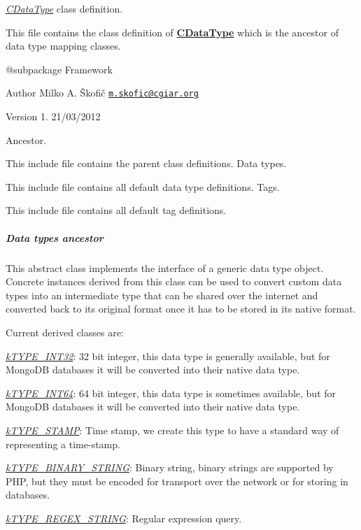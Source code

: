{\itshape \hyperlink{class_c_data_type}{C\-Data\-Type}} class definition.

This file contains the class definition of {\bfseries \hyperlink{class_c_data_type}{C\-Data\-Type}} which is the ancestor of data type mapping classes.

\begin{DoxyVerb} @subpackage        Framework
\end{DoxyVerb}


\begin{DoxyAuthor}{Author}
Milko A. Škofič \href{mailto:m.skofic@cgiar.org}{\tt m.\-skofic@cgiar.\-org} 
\end{DoxyAuthor}
\begin{DoxyVersion}{Version}
1. 21/03/2012
\end{DoxyVersion}
Ancestor.

This include file contains the parent class definitions. Data types.

This include file contains all default data type definitions. Tags.

This include file contains all default tag definitions. \subparagraph*{Data types ancestor}

This abstract class implements the interface of a generic data type object. Concrete instances derived from this class can be used to convert custom data types into an intermediate type that can be shared over the internet and converted back to its original format once it has to be stored in its native format.

Current derived classes are\-:


\begin{DoxyItemize}
\item {\itshape \hyperlink{}{k\-T\-Y\-P\-E\-\_\-\-I\-N\-T32}}\-: 32 bit integer, this data type is generally available, but for Mongo\-D\-B databases it will be converted into their native data type. 
\item {\itshape \hyperlink{}{k\-T\-Y\-P\-E\-\_\-\-I\-N\-T64}}\-: 64 bit integer, this data type is sometimes available, but for Mongo\-D\-B databases it will be converted into their native data type. 
\item {\itshape \hyperlink{}{k\-T\-Y\-P\-E\-\_\-\-S\-T\-A\-M\-P}}\-: Time stamp, we create this type to have a standard way of representing a time-\/stamp. 
\item {\itshape \hyperlink{}{k\-T\-Y\-P\-E\-\_\-\-B\-I\-N\-A\-R\-Y\-\_\-\-S\-T\-R\-I\-N\-G}}\-: Binary string, binary strings are supported by P\-H\-P, but they must be encoded for transport over the network or for storing in databases. 
\item {\itshape \hyperlink{}{k\-T\-Y\-P\-E\-\_\-\-R\-E\-G\-E\-X\-\_\-\-S\-T\-R\-I\-N\-G}}\-: Regular expression query. 
\end{DoxyItemize}

